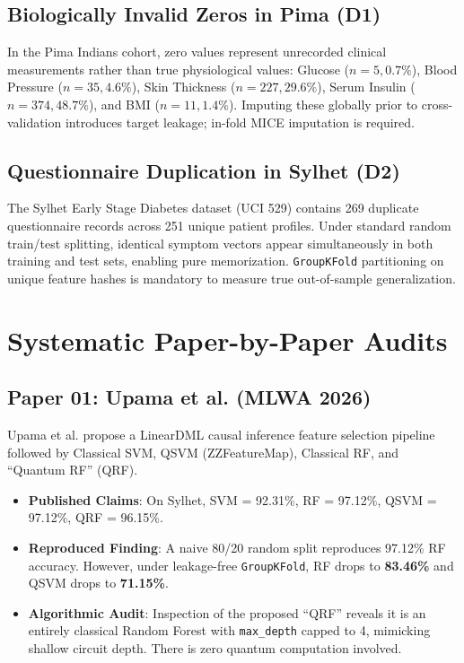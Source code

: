 \documentclass[10pt,journal,compsoc]{IEEEtran}
\begin{document}
\subsection{Biologically Invalid Zeros in Pima (D1)}
In the Pima Indians cohort, zero values represent unrecorded clinical measurements rather than true physiological values: Glucose ($n=5, 0.7\%$), Blood Pressure ($n=35, 4.6\%$), Skin Thickness ($n=227, 29.6\%$), Serum Insulin ($n=374, 48.7\%$), and BMI ($n=11, 1.4\%$). Imputing these globally prior to cross-validation introduces target leakage; in-fold MICE imputation is required.

\subsection{Questionnaire Duplication in Sylhet (D2)}
The Sylhet Early Stage Diabetes dataset (UCI 529) contains 269 duplicate questionnaire records across 251 unique patient profiles. Under standard random train/test splitting, identical symptom vectors appear simultaneously in both training and test sets, enabling pure memorization. \texttt{GroupKFold} partitioning on unique feature hashes is mandatory to measure true out-of-sample generalization.

\section{Systematic Paper-by-Paper Audits}

\subsection{Paper 01: Upama et al. (MLWA 2026)}
Upama et al. propose a LinearDML causal inference feature selection pipeline followed by Classical SVM, QSVM (ZZFeatureMap), Classical RF, and ``Quantum RF'' (QRF). 
\begin{itemize}
    \item \textbf{Published Claims}: On Sylhet, SVM = 92.31\%, RF = 97.12\%, QSVM = 97.12\%, QRF = 96.15\%.
    \item \textbf{Reproduced Finding}: A naive 80/20 random split reproduces 97.12\% RF accuracy. However, under leakage-free \texttt{GroupKFold}, RF drops to \textbf{83.46\%} and QSVM drops to \textbf{71.15\%}.
    \item \textbf{Algorithmic Audit}: Inspection of the proposed ``QRF'' reveals it is an entirely classical Random Forest with \texttt{max\_depth} capped to 4, mimicking shallow circuit depth. There is zero quantum computation involved.
\end{itemize}
\end{document}
